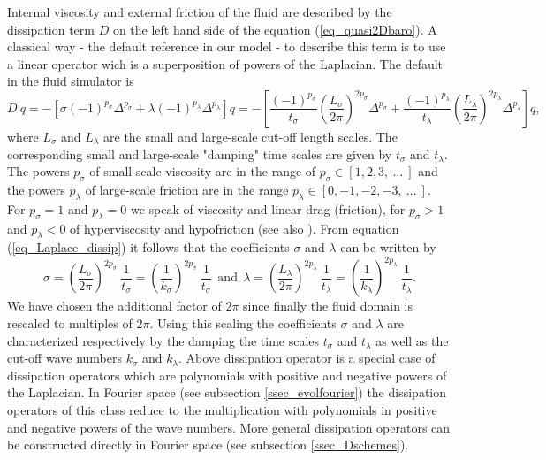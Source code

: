 Internal viscosity and external friction of the fluid are described by 
the dissipation term $D$ on the left hand side of the equation 
(\ref{eq_quasi2Dbaro}). A classical way - the default reference in our
 model - to describe this term is to use a linear operator wich is a
superposition of powers of the Laplacian. 
The default in the fluid simulator is
\begin{equation} \label{eq_Laplace_dissip}
  D \ q = - \left[\sigma \left(-1 \right)^{p_{\sigma}} \Delta^{p_{\sigma}}
                     +
                  \lambda \left(-1 \right)^{p_{\lambda}} \Delta^{p_{\lambda}}
            \right] q
        = - \left[ 
              \frac{\left(-1 \right)^{p_{\sigma}}}{t_{\sigma}} 
              \left( 
               \frac{L_{\sigma}}{2 \pi}
              \right)^{2 p_{\sigma}}
              \Delta^{p_{\sigma}}
               +
              \frac{\left(-1 \right)^{p_{\lambda}}}{t_{\lambda}} 
              \left( 
                \frac{L_{\lambda}}{2 \pi}
              \right)^{2 p_{\lambda}}
              \Delta^{p_{\lambda}}
            \right] q,
\end{equation}
where $L_{\sigma}$ and $L_{\lambda}$ are the small and 
large-scale cut-off length scales. The corresponding small and 
large-scale "damping" time scales are given by $t_{\sigma}$ 
and $t_{\lambda}$. The powers $p_{\sigma}$ of small-scale 
viscosity are in the range of $p_{\sigma} \in [1,2,3, \ \dots \ ]$ 
and the powers $p_{\lambda}$ of large-scale friction are in the 
range $p_{\lambda} \in [0,-1,-2,-3, \ \dots \ ]$. 
For $p_{\sigma} = 1$ and $p_{\lambda} = 0$ we speak of viscosity
and linear drag (friction), for $p_{\sigma} > 1$ and $p_{\lambda} < 0$
of hyperviscosity and hypofriction (see also \cite{danilovandgurarie2001}).
From equation (\ref{eq_Laplace_dissip}) it follows that the coefficients
$\sigma$ and $\lambda$ can be written by
\begin{equation} \label{eq_siglam}
  \sigma  = \left(\frac{L_{\sigma}}{2 \pi} \right)^{2 p_{\sigma}}
            \ \frac{1}{t_{\sigma}} 
          = \left(\frac{1}{k_{\sigma}}\right)^{2 p_{\sigma}}
            \ \frac{1}{t_{\sigma}} 
  \ \ \mbox{and} \ \
  \lambda = \left(\frac{L_{\lambda}}{2 \pi} \right)^{2 p_{\lambda}}
            \ \frac{1}{t_{\lambda}}
          = \left(\frac{1}{k_{\lambda}} \right)^{2 p_{\lambda}}
            \ \frac{1}{t_{\lambda}}.
\end{equation}
We have chosen the additional factor of $2 \pi$ since finally the
fluid domain is rescaled to multiples of $2 \pi$. Using this scaling
the coefficients $\sigma$ and $\lambda$ are characterized respectively 
by the damping the time scales $t_{\sigma}$ and $t_{\lambda}$ as well
as the cut-off wave numbers $k_{\sigma}$ and $k_{\lambda}$.
Above dissipation operator is a special case of dissipation operators 
which are polynomials with positive and negative powers of the Laplacian. 
In Fourier space (see subsection \ref{ssec_evolfourier}) the dissipation 
operators of this class reduce to the multiplication with polynomials 
in positive and negative powers of the wave numbers. More general 
dissipation operators can be constructed directly in Fourier space 
(see subsection \ref{ssec_Dschemes}).

